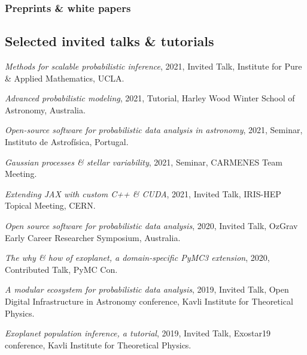 \documentclass[12pt,letterpaper]{article}
\begin{document}
  \subsubsection{Preprints \& white papers}
  \begin{list}{}{\cvlist}
    
  \end{list}

\subsection{Selected invited talks \& tutorials}
\begin{list}{}{\cvlist}

  \item \emph{Methods for scalable probabilistic inference},
      2021, Invited Talk, Institute for Pure \& Applied Mathematics, UCLA.

  \item \emph{Advanced probabilistic modeling},
      2021, Tutorial, Harley Wood Winter School of Astronomy, Australia.

  \item \emph{Open-source software for probabilistic data analysis in astronomy},
      2021, Seminar, Instituto de Astrof\'isica, Portugal.

  \item \emph{Gaussian processes \& stellar variability},
      2021, Seminar, CARMENES Team Meeting.

  \item \emph{Extending JAX with custom C++ \& CUDA},
        2021, Invited Talk, IRIS-HEP Topical Meeting, CERN.

  \item \emph{Open source software for probabilistic data analysis},
        2020, Invited Talk, OzGrav Early Career Researcher Symposium, Australia.

  \item \emph{The why \& how of exoplanet, a domain-specific PyMC3 extension},
        2020, Contributed Talk, PyMC Con.

  \item \emph{A modular ecosystem for probabilistic data analysis},
        2019, Invited Talk, Open Digital Infrastructure in Astronomy conference,
        Kavli Institute for Theoretical Physics.

  \item \emph{Exoplanet population inference, a tutorial},
        2019, Invited Talk, Exostar19 conference,
        Kavli Institute for Theoretical Physics.


\end{list}
\end{document}
